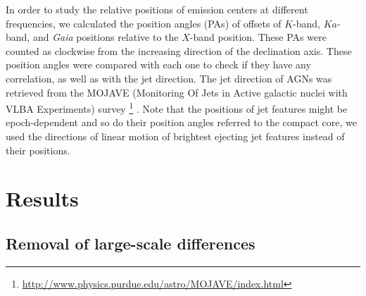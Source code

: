 \documentclass{aa}
\begin{document}
   In order to study the relative positions of emission centers at different frequencies, we calculated the position angles (PAs) of offsets of $K$-band, $Ka$-band, and \textit{Gaia} positions relative to the $X$-band position.
   These PAs were counted as clockwise from the increasing direction of the declination axis.
   These position angles were compared with each one to check if they have any correlation, as well as with the jet direction.
   The jet direction of AGNs was retrieved from the MOJAVE (Monitoring Of Jets in Active galactic nuclei with VLBA Experiments) survey \footnote{\url{http://www.physics.purdue.edu/astro/MOJAVE/index.html}} \citep[][]{2019ApJ...874...43L}.
   Note that the positions of jet features might be epoch-dependent and so do their position angles referred to the compact core, we used the directions of linear motion of brightest ejecting jet features instead of their positions.


\section{Results}    \label{sec:result}


\subsection{Removal of large-scale differences}    \label{subsec:remove-sys}
\end{document}
